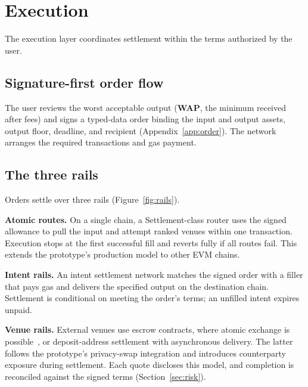 \section{Execution}\label{sec:execution}

The execution layer coordinates settlement within the terms authorized by the user.

\subsection{Signature-first order flow}\label{sec:signature-flow}

The user reviews the worst acceptable output (\textbf{WAP}, the minimum received after fees) and signs a typed-data order binding the input and output assets, output floor, deadline, and recipient (Appendix~\ref{app:order}). The network arranges the required transactions and gas payment.

\subsection{The three rails}\label{sec:rails}

Orders settle over three rails (Figure~\ref{fig:rails}).

\textbf{Atomic routes.} On a single chain, a Settlement-class router uses the signed allowance to pull the input and attempt ranked venues within one transaction. Execution stops at the first successful fill and reverts fully if all routes fail. This extends the prototype's production model to other EVM chains.

\textbf{Intent rails.} An intent settlement network matches the signed order with a filler that pays gas and delivers the specified output on the destination chain. Settlement is conditional on meeting the order's terms; an unfilled intent expires unpaid.

\textbf{Venue rails.} External venues use escrow contracts, where atomic exchange is possible~\cite{atomicswaps}, or deposit-address settlement with asynchronous delivery. The latter follows the prototype's privacy-swap integration and introduces counterparty exposure during settlement. Each quote discloses this model, and completion is reconciled against the signed terms (Section~\ref{sec:risk}).

